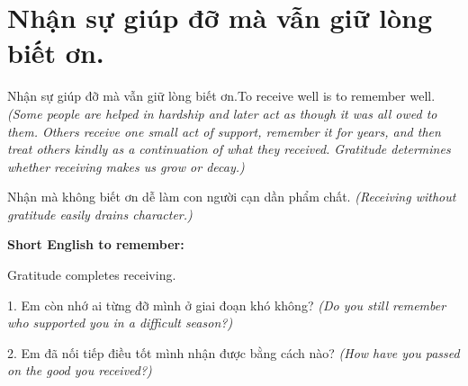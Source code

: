 \section{Nhận sự giúp đỡ mà vẫn giữ lòng biết ơn.}
\begin{truyen}{Nhận sự giúp đỡ mà vẫn giữ lòng biết ơn.}{To receive well is to remember well.}
\textit{(Some people are helped in hardship and later act as though it was all owed to them. Others receive one small act of support, remember it for years, and then treat others kindly as a continuation of what they received. Gratitude determines whether receiving makes us grow or decay.)}
\end{truyen}
\begin{baihoc}
Nhận mà không biết ơn dễ làm con người cạn dần phẩm chất.
\textit{(Receiving without gratitude easily drains character.)}
\end{baihoc}
\begin{ghinhoanh}
\textbf{Short English to remember:}

Gratitude completes receiving.
\end{ghinhoanh}
\begin{tuhocnhanh}
1. Em còn nhớ ai từng đỡ mình ở giai đoạn khó không? \textit{(Do you still remember who supported you in a difficult season?)}

2. Em đã nối tiếp điều tốt mình nhận được bằng cách nào? \textit{(How have you passed on the good you received?)}
\end{tuhocnhanh}
\ngancach

